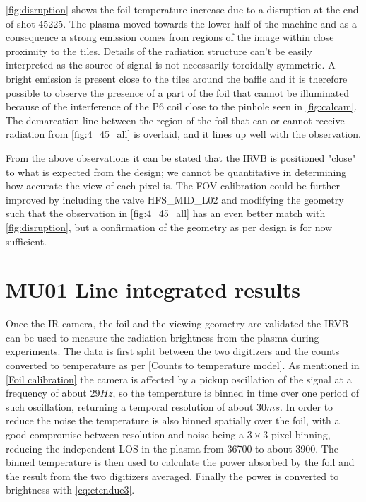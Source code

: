 \autoref{fig:disruption} shows the foil temperature increase due to a disruption at the end of shot 45225. The plasma moved towards the lower half of the machine and as a consequence a strong emission comes from regions of the image within close proximity to the tiles. Details of the radiation structure can't be easily interpreted as the source of signal is not necessarily toroidally symmetric. A bright emission is present close to the tiles around the baffle and it is therefore possible to observe the presence of a part of the foil that cannot be illuminated because of the interference of the P6 coil close to the pinhole seen in \autoref{fig:calcam}. The demarcation line between the region of the foil that can or cannot receive radiation from \autoref{fig:4_45_all} is overlaid, and it lines up well with the observation.

From the above observations it can be stated that the IRVB is positioned "close" to what is expected from the design; we cannot be quantitative in determining how accurate the view of each pixel is. The FOV calibration could be further improved by including the valve HFS\_MID\_L02 and modifying the geometry such that the observation in \autoref{fig:4_45_all} has an even better match with \autoref{fig:disruption}, but a confirmation of the geometry as per design is for now sufficient.



\section{MU01 Line integrated results}\label{MU01 Line integrated results}

Once the IR camera, the foil and the viewing geometry are validated the IRVB can be used to measure the radiation brightness from the plasma during experiments. The data is first split between the two digitizers and the counts converted to temperature as per \autoref{Counts to temperature model}. As mentioned in \autoref{Foil calibration} the camera is affected by a pickup oscillation of the signal at a frequency of about $29Hz$, so the temperature is binned in time over one period of such oscillation, returning a temporal resolution of about $30ms$. In order to reduce the noise the temperature is also binned spatially over the foil, with a good compromise between resolution and noise being a $3\times3$ pixel binning, reducing the independent LOS in the plasma from 36700 to about 3900. The binned temperature is then used to calculate the power absorbed by the foil and the result from the two digitizers averaged. Finally the power is converted to brightness with \autoref{eq:etendue3}. %


